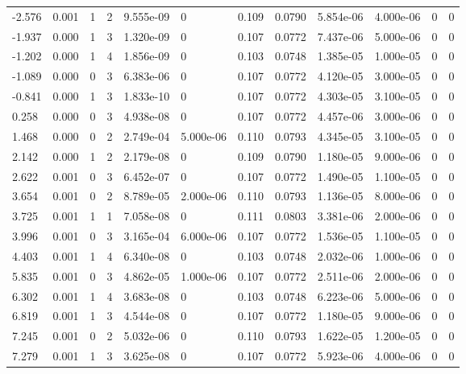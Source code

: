 \documentclass[preview]{standalone}
\begin{document}
{{\begin{tabular}{L{1.2cm}C{1.2cm} C{0.3cm}C{0.5cm} C{1.4cm}C{1.4cm} C{1.4cm}C{1.4cm} C{1.6cm}C{1.6cm} C{1.6cm}C{1.6cm}}
  -2.576  &  0.001  & 1     &  2 &  9.555e-09  & 0  &  0.109&   0.0790& 5.854e-06 & 4.000e-06   &  0 & 0  \\ 
  -1.937  &  0.000  & 1     &  3 &  1.320e-09  & 0  &  0.107&   0.0772& 7.437e-06 & 5.000e-06   &  0 & 0  \\ 
  -1.202  &  0.000  & 1     &  4 &  1.856e-09  & 0  &  0.103&   0.0748& 1.385e-05 & 1.000e-05   &  0 & 0  \\ 
  -1.089  &  0.000  & 0     &  3 &  6.383e-06  & 0  &  0.107&   0.0772& 4.120e-05 & 3.000e-05   &  0 & 0  \\ 
  -0.841  &  0.000  & 1     &  3 &  1.833e-10  & 0  &  0.107&   0.0772& 4.303e-05 & 3.100e-05   &  0 & 0  \\ 
  0.258  &  0.000  & 0     &  3 &  4.938e-08  & 0  &  0.107&   0.0772& 4.457e-06 & 3.000e-06   &  0 & 0  \\ 
  1.468  &  0.000  & 0     &  2 &  2.749e-04  & 5.000e-06  &  0.110&   0.0793& 4.345e-05 & 3.100e-05   &  0 & 0  \\ 
  2.142  &  0.000  & 1     &  2 &  2.179e-08  & 0  &  0.109&   0.0790& 1.180e-05 & 9.000e-06   &  0 & 0  \\ 
  2.622  &  0.001  & 0     &  3 &  6.452e-07  & 0  &  0.107&   0.0772& 1.490e-05 & 1.100e-05   &  0 & 0  \\ 
  3.654  &  0.001  & 0     &  2 &  8.789e-05  & 2.000e-06  &  0.110&   0.0793& 1.136e-05 & 8.000e-06   &  0 & 0  \\ 
  3.725  &  0.001  & 1     &  1 &  7.058e-08  & 0  &  0.111&   0.0803& 3.381e-06 & 2.000e-06   &  0 & 0  \\ 
  3.996  &  0.001  & 0     &  3 &  3.165e-04  & 6.000e-06  &  0.107&   0.0772& 1.536e-05 & 1.100e-05   &  0 & 0  \\ 
  4.403  &  0.001  & 1     &  4 &  6.340e-08  & 0  &  0.103&   0.0748& 2.032e-06 & 1.000e-06   &  0 & 0  \\ 
  5.835  &  0.001  & 0     &  3 &  4.862e-05  & 1.000e-06  &  0.107&   0.0772& 2.511e-06 & 2.000e-06   &  0 & 0  \\ 
  6.302  &  0.001  & 1     &  4 &  3.683e-08  & 0  &  0.103&   0.0748& 6.223e-06 & 5.000e-06   &  0 & 0  \\ 
  6.819  &  0.001  & 1     &  3 &  4.544e-08  & 0  &  0.107&   0.0772& 1.180e-05 & 9.000e-06   &  0 & 0  \\ 
  7.245  &  0.001  & 0     &  2 &  5.032e-06  & 0  &  0.110&   0.0793& 1.622e-05 & 1.200e-05   &  0 & 0  \\ 
  7.279  &  0.001  & 1     &  3 &  3.625e-08  & 0  &  0.107&   0.0772& 5.923e-06 & 4.000e-06   &  0 & 0  \\ 

\end{tabular}}}
\end{document}
